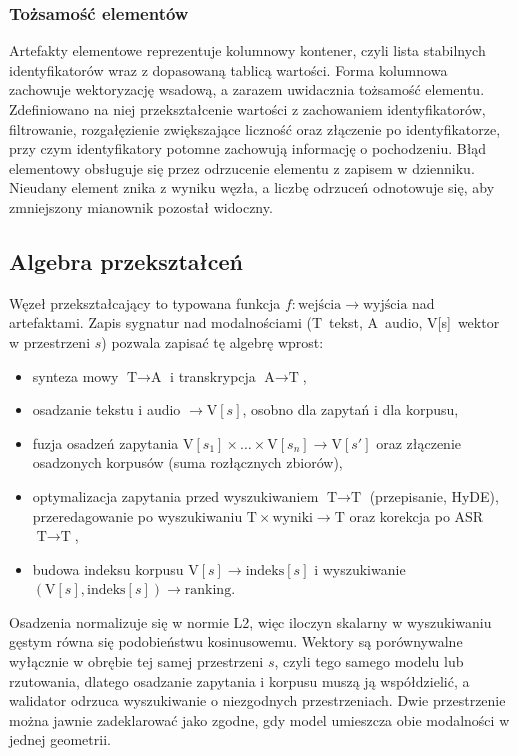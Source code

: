 \subsubsection{Tożsamość elementów}
Artefakty elementowe reprezentuje kolumnowy kontener, czyli lista stabilnych identyfikatorów wraz
z dopasowaną tablicą wartości. Forma kolumnowa zachowuje wektoryzację wsadową, a zarazem
uwidacznia tożsamość elementu. Zdefiniowano na niej przekształcenie wartości z zachowaniem
identyfikatorów, filtrowanie, rozgałęzienie zwiększające liczność oraz złączenie po
identyfikatorze, przy czym identyfikatory potomne zachowują informację o pochodzeniu. Błąd
elementowy obsługuje się przez odrzucenie elementu z zapisem w dzienniku. Nieudany element znika z
wyniku węzła, a liczbę odrzuceń odnotowuje się, aby zmniejszony mianownik pozostał widoczny.

\subsection{Algebra przekształceń}
Węzeł przekształcający to typowana funkcja $f:\text{wejścia} \rightarrow \text{wyjścia}$ nad
artefaktami. Zapis sygnatur nad modalnościami (T~tekst, A~audio, V[s]~wektor w przestrzeni $s$)
pozwala zapisać tę algebrę wprost:
\begin{itemize}
    \item synteza mowy $\text{T} \rightarrow \text{A}$ i transkrypcja
    $\text{A} \rightarrow \text{T}$,
    \item osadzanie tekstu i audio $\rightarrow \text{V}[s]$, osobno dla zapytań
    i dla korpusu,
    \item fuzja osadzeń zapytania $\text{V}[s_1] \times \dots \times \text{V}[s_n]
    \rightarrow \text{V}[s']$ oraz złączenie osadzonych korpusów (suma rozłącznych
    zbiorów),
    \item optymalizacja zapytania przed wyszukiwaniem $\text{T} \rightarrow \text{T}$
    (przepisanie, HyDE), przeredagowanie po wyszukiwaniu
    $\text{T} \times \text{wyniki} \rightarrow \text{T}$ oraz korekcja po ASR
    $\text{T} \rightarrow \text{T}$,
    \item budowa indeksu korpusu $\text{V}[s] \rightarrow \text{indeks}[s]$
    i wyszukiwanie $(\text{V}[s], \text{indeks}[s]) \rightarrow \text{ranking}$.
\end{itemize}
Osadzenia normalizuje się w normie L2, więc iloczyn skalarny w wyszukiwaniu gęstym równa się
podobieństwu kosinusowemu. Wektory są porównywalne wyłącznie w obrębie tej samej przestrzeni
$s$, czyli tego samego modelu lub rzutowania, dlatego osadzanie zapytania i korpusu muszą ją
współdzielić, a walidator odrzuca wyszukiwanie o niezgodnych przestrzeniach. Dwie przestrzenie
można jawnie zadeklarować jako zgodne, gdy model umieszcza obie modalności w jednej geometrii.

